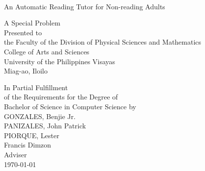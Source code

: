 \begin{titlepage}
\centering

 \\
\vspace{0.5cm}
An Automatic Reading Tutor for Non-reading Adults

\vspace{1.75cm}
A Special Problem\\
Presented to\\
the Faculty of the Division of Physical Sciences and Mathematics\\
College of Arts and Sciences\\
University of the Philippines Visayas\\
Miag-ao, Iloilo

\vspace{1.75cm}
In Partial Fulfillment\\
of the Requirements for the Degree of\\
Bachelor of Science in Computer Science
\vspace{1.75cm}
by\\

\vspace{1cm}
GONZALES, Benjie Jr.  \\
PANIZALES, John Patrick\\
PIORQUE, Lester \\

\vspace{1.75cm}
Francis Dimzon\\
Adviser\\

\vspace{1.75cm}
\today
\end{titlepage}

